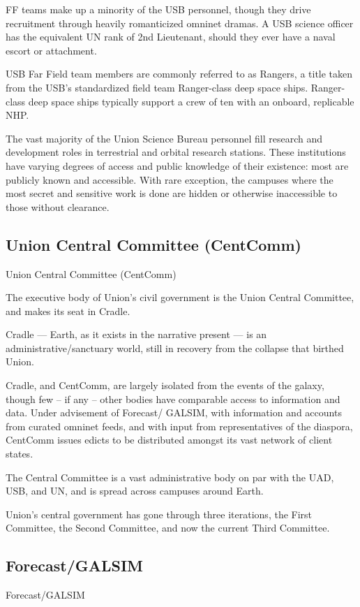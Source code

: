 FF teams make up a minority of the USB personnel, though they drive recruitment through
heavily romanticized omninet dramas. A USB science officer has the equivalent UN rank of 2nd
Lieutenant, should they ever have a naval escort or attachment.


USB Far Field team members are commonly referred to as Rangers, a title taken from the USB’s
standardized field team Ranger-class deep space ships. Ranger-class deep space ships typically
support a crew of ten with an onboard, replicable NHP.


The vast majority of the Union Science Bureau personnel fill research and development roles in
terrestrial and orbital research stations. These institutions have varying degrees of access and
public knowledge of their existence: most are publicly known and accessible. With rare
exception, the campuses where the most secret and sensitive work is done are hidden or
otherwise inaccessible to those without clearance.


\subsection{Union Central Committee (CentComm)}

Union Central Committee (CentComm)

The executive body of Union’s civil government is the Union Central Committee, and makes its
seat in Cradle.


Cradle — Earth, as it exists in the narrative present — is an administrative/sanctuary world, still
in recovery from the collapse that birthed Union.





Cradle, and CentComm, are largely isolated from the events of the galaxy, though few -- if any --
other bodies have comparable access to information and data. Under advisement of Forecast/
GALSIM, with information and accounts from curated omninet feeds, and with input from
representatives of the diaspora, CentComm issues edicts to be distributed amongst its vast
network of client states.


The Central Committee  is a vast administrative body on par with the UAD, USB, and UN, and is
spread across campuses around Earth.


Union’s central government has gone through three iterations, the First Committee, the Second
Committee, and now the current Third Committee.

\subsection{Forecast/GALSIM}
Forecast/GALSIM

